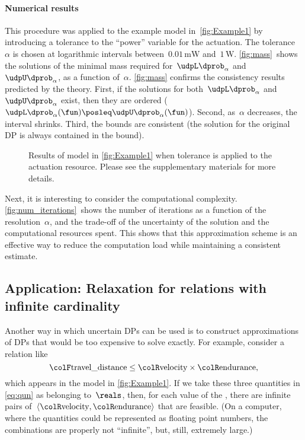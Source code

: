 \paragraph*{Numerical results}

This procedure was applied to the example model in~\cref{fig:Example1}
by introducing a tolerance to the ``power'' variable for the actuation.
The tolerance~$\alpha$ is chosen at logarithmic intervals between~$0.01\,\text{mW}$
and~$1\,\text{W}$. \cref{fig:mass}~shows the solutions of
the minimal mass required for~$\udpL\dprob_{\alpha}$ and~$\udpU\dprob_{\alpha}$,
as a function of~$\alpha$. \cref{fig:mass} confirms the consistency
results predicted by the theory. First, if the solutions for both~$\udpL\dprob_{\alpha}$
and~$\udpU\dprob_{\alpha}$ exist, then they are ordered ($\udpL\dprob_{\alpha}(\fun)\posleq\udpU\dprob_{\alpha}(\fun)$).
Second, as~$\alpha$ decreases, the interval shrinks. Third, the
bounds are consistent (the solution for the original DP is always
contained in the bound).

\begin{figure}[h]

  \caption{Results of model in \cref{fig:Example1} when tolerance is applied
  to the actuation  resource. Please see the supplementary
  materials for more details.}
\end{figure}

Next, it is interesting to consider the computational complexity.
\cref{fig:num_iterations}~shows the number of iterations as
a function of the resolution~$\alpha$, and the trade-off of the
uncertainty of the solution and the computational resources spent.
This shows that this approximation scheme is an effective way to reduce
the computation load while maintaining a consistent estimate.

\subsection{Application: Relaxation for relations with infinite cardinality\label{sec:Application-relax}}

Another way in which uncertain DPs can be used is to construct approximations
of DPs that would be too expensive to solve exactly. For example,
consider a relation like
\begin{equation}
{\colF\text{travel\_distance}}
  \leq{\colR\text{velocity}}\times{\colR\text{endurance}},\label{eq:qun}
\end{equation}
which appears in the model in \cref{fig:Example1}. If we take
these three quantities in \cref{eq:qun} as belonging to~$\reals$,
then, for each value of the , there are infinite
pairs of~$\left\langle {\colR\text{velocity}},{\colR\text{endurance}}\right\rangle $
that are feasible. (On a computer, where the quantities could be represented
as floating point numbers, the combinations are properly not ``infinite'',
but, still, extremely large.)


